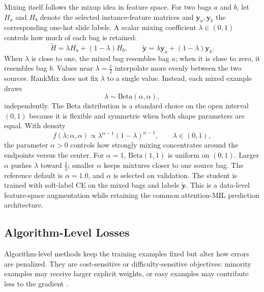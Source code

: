 \documentclass[11pt]{article}
\begin{document}
Mixing itself follows the mixup idea in feature space. For two bags $a$ and $b$, let $H_a$ and $H_b$ denote the selected instance-feature matrices and $\mathbf{y}_a,\mathbf{y}_b$ the corresponding one-hot slide labels. A scalar mixing coefficient $\lambda\in(0,1)$ controls how much of each bag is retained:
\begin{equation}
  \widetilde{H}=\lambda H_a+(1-\lambda)H_b,
  \qquad
  \widetilde{\mathbf{y}}=\lambda \mathbf{y}_a+(1-\lambda)\mathbf{y}_b.
  \label{eq:rankmix}
\end{equation}
\noindent When $\lambda$ is close to one, the mixed bag resembles bag $a$; when it is close to zero, it resembles bag $b$. Values near $\lambda=\tfrac{1}{2}$ interpolate more evenly between the two sources. RankMix does not fix $\lambda$ to a single value. Instead, each mixed example draws
\begin{equation}
  \lambda \sim \mathrm{Beta}(\alpha,\alpha),
  \label{eq:rankmix-beta}
\end{equation}
\noindent independently. The Beta distribution is a standard choice on the open interval $(0,1)$ because it is flexible and symmetric when both shape parameters are equal. With density
\begin{equation}
  f(\lambda;\alpha,\alpha)\propto \lambda^{\alpha-1}(1-\lambda)^{\alpha-1},
  \qquad \lambda\in(0,1),
  \label{eq:beta-density}
\end{equation}
\noindent the parameter $\alpha>0$ controls how strongly mixing concentrates around the endpoints versus the center. For $\alpha=1$, $\mathrm{Beta}(1,1)$ is uniform on $(0,1)$. Larger $\alpha$ pushes $\lambda$ toward $\tfrac{1}{2}$; smaller $\alpha$ keeps mixtures closer to one source bag. The reference default is $\alpha=\num{1.0}$, and $\alpha$ is selected on validation. The student is trained with soft-label CE on the mixed bags and labels $\widetilde{\mathbf{y}}$. This is a data-level feature-space augmentation while retaining the common attention-MIL prediction architecture.

\subsection{Algorithm-Level Losses}
Algorithm-level methods keep the training examples fixed but alter how errors are penalized. They are cost-sensitive or difficulty-sensitive objectives: minority examples may receive larger explicit weights, or easy examples may contribute less to the gradient \citep{saini2023tacklingClass,scholz2024imbalanceAware}.
\end{document}
